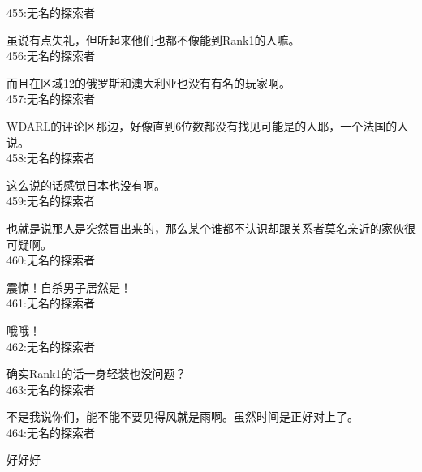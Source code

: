 455:无名的探索者

虽说有点失礼，但听起来他们也都不像能到Rank1的人嘛。\\

456:无名的探索者

而且在区域12的俄罗斯和澳大利亚也没有有名的玩家啊。\\

457:无名的探索者

WDARL的评论区那边，好像直到6位数都没有找见可能是的人耶，一个法国的人说。\\

458:无名的探索者

这么说的话感觉日本也没有啊。\\

459:无名的探索者

也就是说那人是突然冒出来的，那么某个谁都不认识却跟关系者莫名亲近的家伙很可疑啊。\\

460:无名的探索者

震惊！自杀男子居然是！\\

461:无名的探索者

哦哦！\\

462:无名的探索者

确实Rank1的话一身轻装也没问题？\\

463:无名的探索者

不是我说你们，能不能不要见得风就是雨啊。虽然时间是正好对上了。\\

464:无名的探索者

好好好\\
